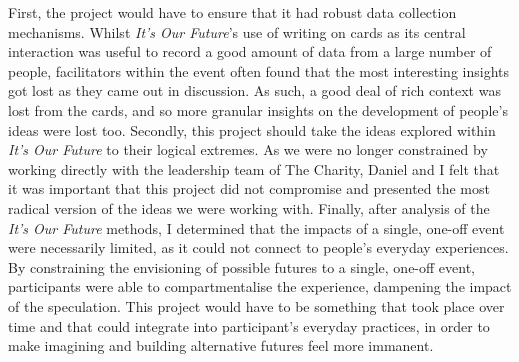 First, the project would have to ensure that it had robust data collection mechanisms. Whilst \emph{It's Our Future}'s use of writing on cards as its central interaction was useful to record a good amount of data from a large number of people, facilitators within the event often found that the most interesting insights got lost as they came out in discussion. As such, a good deal of rich context was lost from the cards, and so more granular insights on the development of people's ideas were lost too. Secondly, this project should take the ideas explored within \emph{It's Our Future} to their logical extremes. As we were no longer constrained by working directly with the leadership team of The Charity, Daniel and I felt that it was important that this project did not compromise and presented the most radical version of the ideas we were working with. Finally, after analysis of the \emph{It's Our Future} methods, I determined that the impacts of a single, one-off event were necessarily limited, as it could not connect to people's everyday experiences. By constraining the envisioning of possible futures to a single, one-off event, participants were able to compartmentalise the experience, dampening the impact of the speculation. This project would have to be something that took place over time and that could integrate into participant's everyday practices, in order to make imagining and building alternative futures feel more immanent.  

